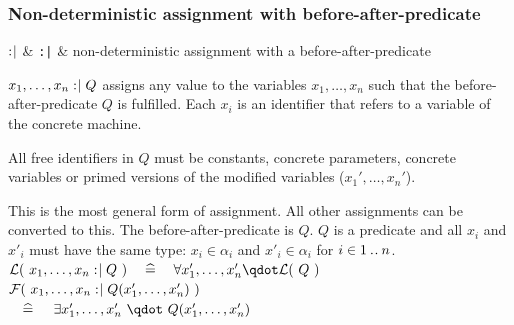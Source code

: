 \begin{samepage}
\subsubsection{Non-deterministic assignment with before-after-predicate}
\label{nondeterministic_assignments}

\begin{rrnames}
  $\mathrel{:\mkern1mu\mid}$ & \texttt{:|} & non-deterministic assignment with a before-after-predicate
\end{rrnames}
\begin{rodinrefentry}
  \rrdesc
    $x_1,\ldots,x_n \mathrel{:\mkern1mu\mid} Q$
    assigns any value to the variables $x_1,\ldots,x_n$ such that the
    before-after-predicate $Q$ is fulfilled.
    Each $x_i$ is an identifier that refers to a variable of the concrete machine.
    
    All free identifiers in $Q$ must be constants, concrete parameters,
    concrete variables or primed versions of the modified variables ($x_1',\ldots,x_n'$).

    This is the most general form of assignment. All other assignments can be converted to this.
  \rrdef
    The before-after-predicate is $Q$.
  \rrtypes
    $Q$ is a predicate and all $x_i$ and $x'_i$ must have the same type:
    $x_i\in\alpha_i$ and $x'_i\in\alpha_i$ for $i\in 1\mathbin{.\mkern1mu.} n$.
  \rrwd
    $\wdl(~x_1,\ldots,x_n \bcmsuch Q~)
    \quad\defi\quad
    \forall x_1',\ldots,x_n' \qdot \wdl(~Q~)$
  \rrfis
    $\mathcal{F}(~x_1,\ldots,x_n \mathrel{:\mkern1mu\mid} Q(x_1',\ldots,x_n')~)$ \\
    $\quad\mathrel{\widehat=}\quad$
    $\exists x_1',\ldots,x_n' ~\qdot~ Q(x_1',\ldots,x_n')$
\end{rodinrefentry}
\end{samepage}

